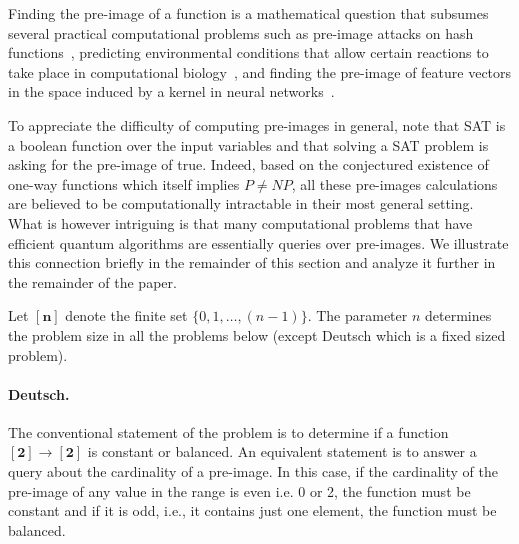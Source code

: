 \documentclass{article}
\newcommand{\finset}[1]{[\mathbf{#1}]}
\begin{document}
\begin{center}
\end{center}

Finding the pre-image of a function is a mathematical question that
subsumes several practical computational problems such as pre-image
attacks on hash functions~\cite{10.1007/978-3-540-25937-4_24},
predicting environmental conditions that allow certain reactions to
take place in computational
biology~\cite{Klotz2013,akutsu2009analyses}, and finding the pre-image
of feature vectors in the space induced by a kernel in neural
networks~\cite{1353287}.

To appreciate the difficulty of computing pre-images in general, note
that SAT is a boolean function over the input variables and that
solving a SAT problem is asking for the pre-image of
\textsf{true}. Indeed, based on the conjectured existence of one-way
functions which itself implies $\mathit{P} \neq \mathit{NP}$, all
these pre-images calculations are believed to be computationally
intractable in their most general setting. What is however intriguing
is that many computational problems that have efficient quantum
algorithms are essentially queries over pre-images. We illustrate this
connection briefly in the remainder of this section and analyze it
further in the remainder of the paper.

Let $\finset{n}$ denote the finite set $\{ 0,1,\ldots,(n-1)\}$. The
parameter $n$ determines the problem size in all the problems below
(except Deutsch which is a fixed sized problem).

\paragraph*{Deutsch.}
The conventional statement of the problem is to determine if a
function $\finset{2} \rightarrow \finset{2}$ is constant or
balanced. An equivalent statement is to answer a query about the
cardinality of a pre-image. In this case, if the cardinality of the
pre-image of any value in the range is even i.e. 0 or 2, the function
must be constant and if it is odd, i.e., it contains just one element,
the function must be balanced.
\end{document}
